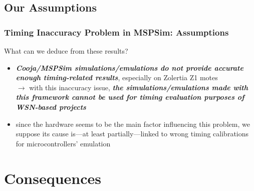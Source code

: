 \documentclass[10pt,c]{beamer}
\renewcommand{\emph}[1]{\textbf{\textit{#1}}}
\begin{document}
\subsection{Our Assumptions}

\begin{frame}
\frametitle{Timing Inaccuracy Problem in MSPSim: Assumptions}
\begin{alertblock}{What can we deduce from these results?}
\begin{itemize}
\item \emph{Cooja/MSPSim simulations/emulations do not provide accurate
enough timing-related results}, especially on Zolertia Z1 motes \\
$\rightarrow$ with this inaccuracy issue, \emph{the simulations/emulations
made with this framework cannot be used for timing evaluation purposes
of WSN-based projects}
\item since the hardware seems to be the main factor influencing this
problem, we suppose its cause is---at least partially---linked to wrong
timing calibrations for microcontrollers' emulation \\
\end{itemize}
\end{alertblock}
\end{frame}


\section{Consequences}
\end{document}
